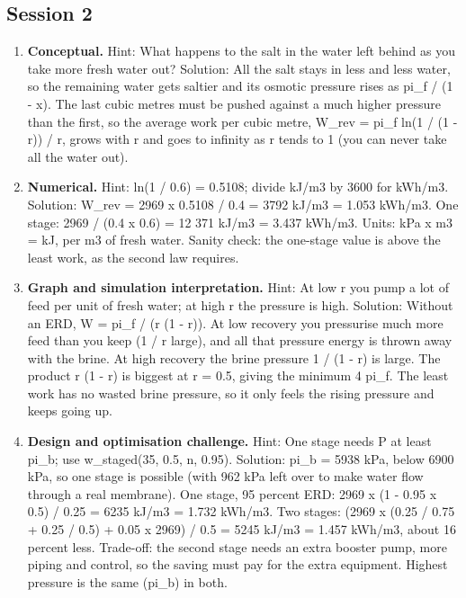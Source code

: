 \documentclass[11pt,a4paper]{article}
\begin{document}
\subsection*{Session 2}
\begin{enumerate}[nosep]
\item \textbf{Conceptual.} Hint: What happens to the salt in the water left behind as you take more fresh water out? Solution: All the salt stays in less and less water, so the remaining water gets saltier and its osmotic pressure rises as pi\_f / (1 - x). The last cubic metres must be pushed against a much higher pressure than the first, so the average work per cubic metre, W\_rev = pi\_f ln(1 / (1 - r)) / r, grows with r and goes to infinity as r tends to 1 (you can never take all the water out).
\item \textbf{Numerical.} Hint: ln(1 / 0.6) = 0.5108; divide kJ/m3 by 3600 for kWh/m3. Solution: W\_rev = 2969 x 0.5108 / 0.4 = 3792 kJ/m3 = 1.053 kWh/m3. One stage: 2969 / (0.4 x 0.6) = 12 371 kJ/m3 = 3.437 kWh/m3. Units: kPa x m3 = kJ, per m3 of fresh water. Sanity check: the one-stage value is above the least work, as the second law requires.
\item \textbf{Graph and simulation interpretation.} Hint: At low r you pump a lot of feed per unit of fresh water; at high r the pressure is high. Solution: Without an ERD, W = pi\_f / (r (1 - r)). At low recovery you pressurise much more feed than you keep (1 / r large), and all that pressure energy is thrown away with the brine. At high recovery the brine pressure 1 / (1 - r) is large. The product r (1 - r) is biggest at r = 0.5, giving the minimum 4 pi\_f. The least work has no wasted brine pressure, so it only feels the rising pressure and keeps going up.
\item \textbf{Design and optimisation challenge.} Hint: One stage needs P at least pi\_b; use w\_staged(35, 0.5, n, 0.95). Solution: pi\_b = 5938 kPa, below 6900 kPa, so one stage is possible (with 962 kPa left over to make water flow through a real membrane). One stage, 95 percent ERD: 2969 x (1 - 0.95 x 0.5) / 0.25 = 6235 kJ/m3 = 1.732 kWh/m3. Two stages: (2969 x (0.25 / 0.75 + 0.25 / 0.5) + 0.05 x 2969) / 0.5 = 5245 kJ/m3 = 1.457 kWh/m3, about 16 percent less. Trade-off: the second stage needs an extra booster pump, more piping and control, so the saving must pay for the extra equipment. Highest pressure is the same (pi\_b) in both.
\end{enumerate}
\end{document}
